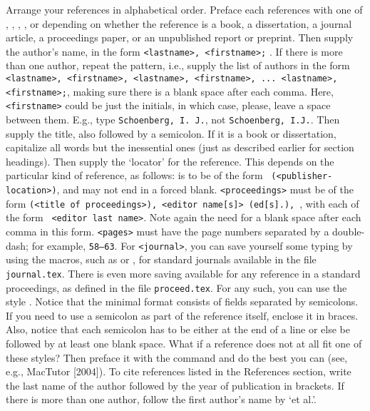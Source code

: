 \bull  Arrange your references in alphabetical order.
\smallskip
\bull Preface each references with
one of , , ,  , or  depending on
whether the reference is a book, a dissertation, a journal article, a
proceedings paper, or an unpublished report or preprint.
\smallskip
\bull Then supply the author's name, in the form {\tt <lastname>, <firstname>;} .
If there is more than one author, repeat the pattern, i.e., supply the list
of authors in the form {\tt <lastname>, <firstname>, <lastname>, <firstname>,
... <lastname>, <firstname>;}, making sure there is a blank space after each
comma. Here, {\tt <firstname>} could be just the
initials, in which case, please, leave a space between them. E.g., type
{\tt Schoenberg, I. J.}, not {\tt Schoenberg, I.J.}.
\smallskip
\bull Then supply the title, also followed by a semicolon. If it is a book
or dissertation, capitalize all words but the inessential ones (just as
described earlier for section headings).
\smallskip
\bull Then supply the `locator' for the reference. This depends on the
particular kind of reference, as follows:
\bigskip
{}
\bigskip
\nobull
{\tt<publisher-info>} is to be of the form {\tt<publisher-name>
(<publisher-location>)}, and {\tt<publisher-name>} may not end in a forced
blank.
\smallskip
\nobull
{\tt<proceedings>} must be of the form {\tt(<title of proceedings>),}\
{\tt<editor name[s]> (ed[s].),}\ {\tt<publisher-info>},
 with each {\tt<editor name>} of the
form {\tt<editor initials> <editor last name>}. Note again the need for a
blank space after each comma in this form.
\smallskip
\nobull
{\tt<pages>} must have the page numbers separated by a double-dash; for example,
{\tt58--63}.
\smallskip
\nobull For {\tt<journal>}, you can save yourself some typing by using the
macros, such as \tb{JAT} or \tb{CA}, for standard journals available in the
file {\tt journal.tex}.
\smallskip
\nobull There is even more saving available for any reference in a standard
proceedings, as defined in the file {\tt proceed.tex}. For any such, you can
use the style \tb{refP\ }{\tt<author>; <title>; <proceedings-macro>;
<pages>;}.
\smallskip
\bull Notice that the minimal format consists of fields separated by
semicolons. If you need to use a semicolon as part of the reference itself,
enclose it in braces. Also, notice that each semicolon has to be either at
the end of a line or else be followed by at least one blank space.
\smallskip
\bull What if a reference does not at all fit one of these styles? Then
preface it with the command \tb{refX} and do the best you can (see, e.g.,
MacTutor [2004]).
\medskip
\noindent To cite references listed in the References section,
write the last name of the author followed by the year of publication in
brackets. If there is more than one author, follow the first author's name by
`et al.'.

